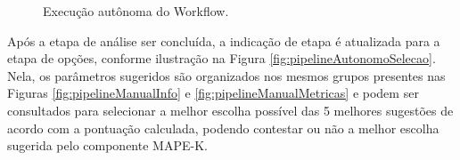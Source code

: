 \documentclass[portugues]{ic-tese}
\begin{document}
\begin{figure}[H]
    \centering
    \caption{Execução autônoma do Workflow.}
    \label{fig:pipelineAutonomo}
\end{figure}

Após a etapa de análise ser concluída, a indicação de etapa é atualizada para a etapa de opções, conforme ilustração na Figura \ref{fig:pipelineAutonomoSelecao}. Nela, os parâmetros sugeridos são organizados nos mesmos grupos presentes nas Figuras \ref{fig:pipelineManualInfo} e \ref{fig:pipelineManualMetricas} e podem ser consultados para selecionar a melhor escolha possível das 5 melhores sugestões de acordo com a pontuação calculada, podendo contestar ou não a melhor escolha sugerida pelo componente MAPE-K.
\end{document}
